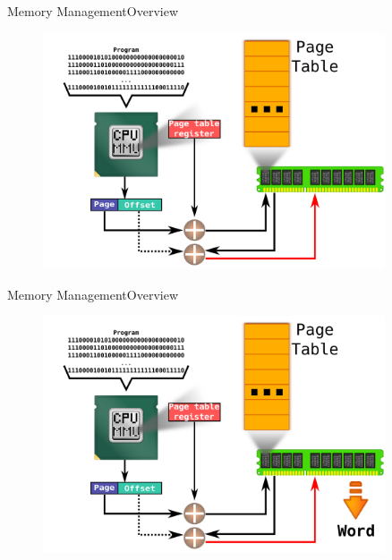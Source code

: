 \documentclass[10pt]{beamer}
\begin{document}
\begin{frame}{Memory Management}{Overview}
  \begin{figure}[ht]
    \centering
    \includegraphics[width=0.9\textwidth, keepaspectratio=true]{images/mmu_e.png}
  \end{figure}
\end{frame}

\begin{frame}{Memory Management}{Overview}
  \begin{figure}[ht]
    \centering
    \includegraphics[width=0.9\textwidth, keepaspectratio=true]{images/mmu_f.png}
  \end{figure}
\end{frame}
\end{document}
